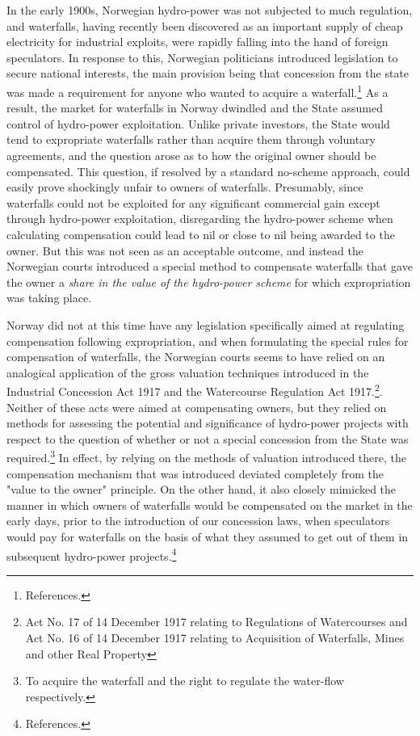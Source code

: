 In the early 1900s, Norwegian hydro-power was not subjected to much regulation, and waterfalls, having recently been discovered as an important supply of cheap electricity for industrial exploits, were rapidly falling into the hand of foreign speculators. In response to this, Norwegian politicians introduced legislation to secure national interests, the main provision being that concession from the state was made a requirement for anyone who wanted to acquire a waterfall.\footnote{References.} As a result, the market for waterfalls in Norway dwindled and the State assumed control of hydro-power exploitation. Unlike private investors, the State would tend to expropriate waterfalls rather than acquire them through voluntary agreements, and the question arose as to how the original owner should be compensated. This question, if resolved by a standard no-scheme approach, could easily prove shockingly unfair to owners of waterfalls. Presumably, since waterfalls could not be exploited for any significant commercial gain except through hydro-power exploitation, disregarding the hydro-power scheme when calculating compensation could lead to nil or close to nil being awarded to the owner. But this was not seen as an acceptable outcome, and instead the Norwegian courts introduced a special method to compensate waterfalls that gave the owner a \emph{share in the value of the hydro-power scheme} for which expropriation was taking place.

Norway did not at this time have any legislation specifically aimed at regulating compensation following expropriation, and when formulating the special rules for compensation of waterfalls, the Norwegian courts seems to have relied on an analogical application of the gross valuation techniques introduced in the Industrial Concession Act 1917 and the Watercourse Regulation Act 1917.\footnote{Act No. 17 of 14 December 1917 relating to Regulations of Watercourses and Act No. 16 of 14 December 1917 relating to Acquisition of Waterfalls, Mines and other Real Property}. Neither of these acts were aimed at compensating owners, but they relied on methods for assessing the potential and significance of hydro-power projects with respect to the question of whether or not a special concession from the State was required.\footnote{To acquire the waterfall and the right to regulate the water-flow respectively.} In effect, by relying on the methods of valuation introduced there, the compensation mechanism that was introduced deviated completely from the "value to the owner" principle. On the other hand, it also closely mimicked the manner in which owners of waterfalls would be compensated on the market in the early days, prior to the introduction of our concession laws, when speculators would pay for waterfalls on the basis of what they assumed to get out of them in subsequent hydro-power projects.\footnote{References.}

